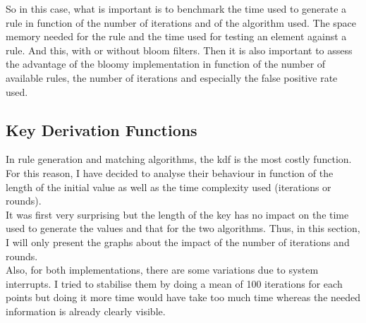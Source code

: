 \documentclass{eplmastersthesis}
\begin{document}
So in this case, what is important is to benchmark the time used to generate a rule in function of the number of iterations and of the algorithm used. The space memory needed for the rule and the time used for testing an element against a rule.
And this, with or without bloom filters. Then it is also important to assess the advantage of the bloomy implementation in function of the number of available rules, the number of iterations and especially the false positive rate used.

\subsection{Key Derivation Functions}
\label{sec:KeyDerivationFunction}
In rule generation and matching algorithms, the \gls{kdf} is the most costly function. For this reason, I have decided to analyse their behaviour in function of the length of the initial value as well as the time complexity used (iterations or rounds).\\

It was first very surprising but the length of the key has no impact on the time used to generate the values and that for the two algorithms. Thus, in this section, I will only present the graphs about the impact of the number of iterations and rounds.\\

Also, for both implementations, there are some variations due to system interrupts. I tried to stabilise them by doing a mean of 100 iterations for each points but doing it more time would have take too much time whereas the needed information is already clearly visible.\\
\end{document}
